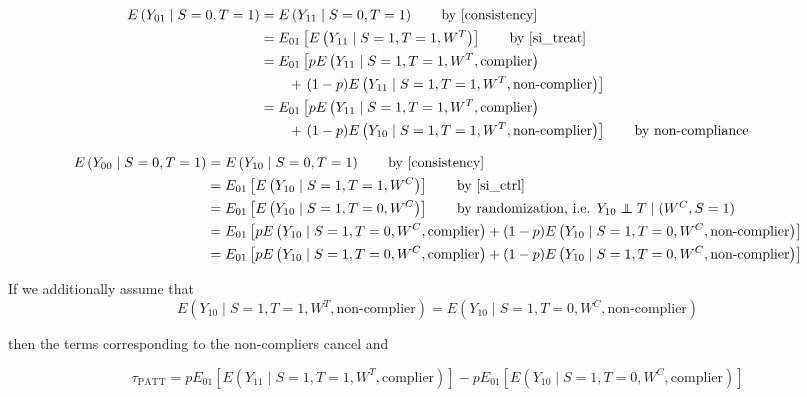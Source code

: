 \documentclass{article}
\newcommand{\ex}{E} %
\newcommand\independent{\protect\mathpalette{\protect\independenT}{\perp}}
\def\independenT#1#2{\mathrel{\rlap{$#1#2$}\mkern2mu{#1#2}}}
\begin{document}
\begin{align*}
\ex\left(Y_{01} \mid S=0, T=1\right) &= \ex\left(Y_{11} \mid S=0, T=1\right) \tag*{by \eqref{consistency}} \\
&= \ex_{01}\left[  \ex\left(Y_{11} \mid S=1, T=1, W^T\right) \right] \tag*{by \eqref{si_treat}} \\
&= \ex_{01}\left[  p\ex\left(Y_{11} \mid S=1, T=1, W^T, \text{complier}\right)\right. \\&\qquad+ \left.(1-p)\ex\left(Y_{11} \mid S=1, T=1, W^T, \text{non-complier}\right) \right]  \\
&= \ex_{01}\left[  p\ex\left(Y_{11} \mid S=1, T=1, W^T, \text{complier}\right)\right. \\& \qquad+ \left.(1-p)\ex\left(Y_{10} \mid S=1, T=1, W^T, \text{non-complier}\right) \right]  \tag*{by non-compliance} \\
\end{align*}

\begin{align*}
\ex\left(Y_{00} \mid S=0, T=1\right) &= \ex\left(Y_{10} \mid S=0, T=1\right) \tag*{by \eqref{consistency}} \\
&= \ex_{01}\left[  \ex\left(Y_{10} \mid S=1, T=1, W^C\right) \right] \tag*{by \eqref{si_ctrl}} \\
&= \ex_{01}\left[  \ex\left(Y_{10} \mid S=1, T=0, W^C\right) \right] \tag*{by randomization, i.e. $Y_{10} \independent T \mid (W^C, S=1)$} \\
&=  \ex_{01}\left[  p\ex\left(Y_{10} \mid S=1, T=0, W^C, \text{complier}\right) + (1-p) \ex\left(Y_{10} \mid S=1, T=0, W^C, \text{non-complier}\right) \right] \\
&=  \ex_{01}\left[  p\ex\left(Y_{10} \mid S=1, T=0, W^C, \text{complier}\right) + (1-p) \ex\left(Y_{10} \mid S=1, T=0, W^C, \text{non-complier}\right) \right] \\
\end{align*}


If we additionally assume that 
$$\ex\left(Y_{10} \mid S=1, T=1, W^T, \text{non-complier}\right) = \ex\left(Y_{10} \mid S=1, T=0, W^C, \text{non-complier}\right)$$

then the terms corresponding to the non-compliers cancel and

\begin{equation}
\tau_{\text{PATT}} = p\ex_{01}\left[  \ex\left(Y_{11} \mid S=1, T=1, W^T, \text{complier}\right)\right] - p \ex_{01}\left[  \ex\left(Y_{10} \mid S=1, T=0, W^C, \text{complier}\right)\right]
\end{equation}
\end{document}

